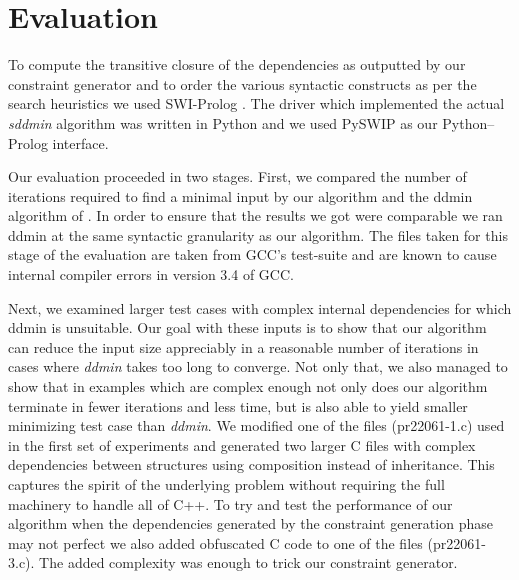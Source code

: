 \documentclass[preprint]{acm_proc_article-sp}
\begin{document}



\section{Evaluation}
To compute the transitive closure of the dependencies as outputted by our
constraint generator and to order the various syntactic constructs as per the
search heuristics we used SWI-Prolog \citep{swipl}. The driver which implemented
the actual \emph{sddmin} algorithm was written in Python and we used PySWIP
\citep{pyswip} as our Python--Prolog interface.

Our evaluation proceeded in two stages.  First, we compared the number of
iterations required to find a minimal input by our algorithm and the ddmin
algorithm of \citeauthor{dd}.  In order to ensure that the results we got were
comparable we ran ddmin at the same syntactic granularity as our algorithm. The
files taken for this stage of the evaluation are taken from GCC's \citep{gcc}
test-suite and are known to cause internal compiler errors in version 3.4 of
GCC.

Next, we examined larger test cases with complex internal dependencies for which
ddmin is unsuitable. Our goal with these inputs is to show that our algorithm
can reduce the input size appreciably in a reasonable number of iterations in
cases where \emph{ddmin} takes too long to converge. Not only that, we also
managed to show that in examples which are complex enough not only does our
algorithm terminate in fewer iterations and less time, but is also able to yield
smaller minimizing test case than \emph{ddmin}. We modified one of the files
(pr22061-1.c) used in the first set of experiments and generated two larger C
files with complex dependencies between structures using composition instead of
inheritance. This captures the spirit of the underlying problem without
requiring the full machinery to handle all of C++. To try and test the
performance of our algorithm when the dependencies generated by the constraint
generation phase may not perfect we also added obfuscated C code to one of the
files (pr22061-3.c). The added complexity was enough to trick our constraint
generator.
\end{document}

